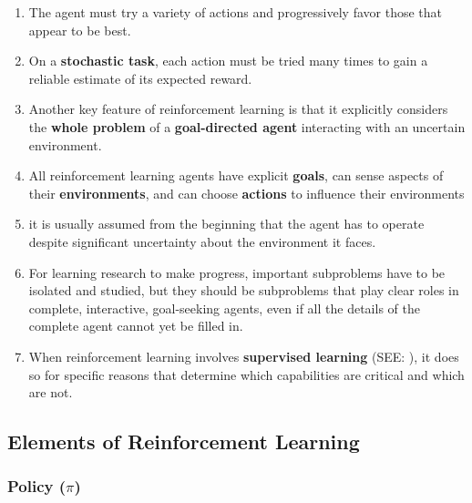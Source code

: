 \begin{enumerate}
    \item The agent must try a variety of actions and progressively favor those that appear to be best. 

    \item On a \textbf{stochastic task}, each action must be tried many times to gain a reliable estimate of its expected reward.

    \item Another key feature of reinforcement learning is that it explicitly considers the \textbf{whole problem} of a \textbf{goal-directed agent} interacting with an uncertain environment.

    \item All reinforcement learning agents have explicit \textbf{goals}, can sense aspects of their \textbf{environments}, and can choose \textbf{actions} to influence their environments

    \item it is usually assumed from the beginning that the agent has to operate despite significant uncertainty about the environment it faces.

    \item  For learning research to make progress, important subproblems have to be isolated and studied, but they should be subproblems that play clear roles in complete, interactive, goal-seeking agents, even if all the details of the complete agent cannot yet be filled in.

    \item When reinforcement learning involves \textbf{supervised learning} (SEE: ), it does so for specific reasons that determine which capabilities are critical and which are not.
\end{enumerate}

\subsection{Elements of Reinforcement Learning \cite{drl-1}}\label{Elements of Reinforcement Learning}

\subsubsection{Policy ($\pi$) \cite{drl-1}}\label{RL: policy}

